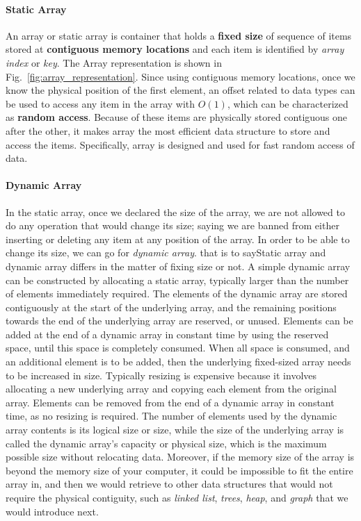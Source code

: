 \documentclass[../main.tex]{subfiles}
\begin{document}
\paragraph{Static Array} An array or static array is container that holds a \textbf{fixed size} of sequence of items stored at \textbf{contiguous memory locations} and each item is identified by \textit{array index} or \textit{key}. The Array representation is shown in Fig.~\ref{fig:array_representation}. Since using contiguous memory locations, once we know the physical position of the first element, an offset related to data types can be used to access any item in the array with $O(1)$, which can be characterized as \textbf{random access}. Because of these items are physically stored contiguous one after the other, it makes array the most efficient data structure to store and access the items. Specifically, array is designed and used for fast random access of data. 


\paragraph{Dynamic Array} In the static array, once we declared the size of the array, we are not allowed to do any operation that would change its size; saying we are banned from either inserting or deleting any item at any position of the array.  In order to be able to change its size, we can go for \textit{dynamic array}.  that is to sayStatic array and dynamic array differs in the matter of fixing size or not. A simple dynamic array can be constructed by allocating a static array, typically larger than the number of elements immediately required. The elements of the dynamic array are stored contiguously at the start of the underlying array, and the remaining positions towards the end of the underlying array are reserved, or unused. Elements can be added at the end of a dynamic array in constant time by using the reserved space, until this space is completely consumed. When all space is consumed, and an additional element is to be added, then the underlying fixed-sized array needs to be increased in size. Typically resizing is expensive because it involves allocating a new underlying array and copying each element from the original array. Elements can be removed from the end of a dynamic array in constant time, as no resizing is required. The number of elements used by the dynamic array contents is its logical size or size, while the size of the underlying array is called the dynamic array's capacity or physical size, which is the maximum possible size without relocating data. Moreover, if the memory size of the array is beyond the memory size of your computer, it could be impossible to fit the entire array in, and then we would retrieve to other data structures that would not require the physical contiguity, such as \textit{linked list}, \textit{trees}, \textit{heap}, and \textit{graph} that we would introduce next. 
\end{document}
